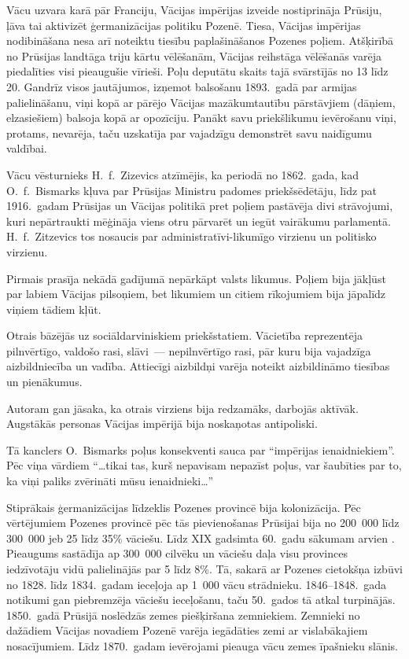 \documentclass[twoside,a5paper,12pt,fleqn,openany]{extbook}
\begin{document}
Vācu uzvara karā pār Franciju, Vācijas impērijas izveide nostiprināja Prūsiju, ļāva tai aktivizēt ģermanizācijas politiku Pozenē. Tiesa, Vācijas impērijas nodibināšana nesa arī noteiktu tiesību paplašināšanos Pozenes poļiem. Atšķirībā no Prūsijas landtāga triju kārtu vēlēšanām, Vācijas reihstāga vēlēšanās varēja piedalīties visi pieaugušie vīrieši. Poļu deputātu skaits tajā svārstījās no 13 līdz 20. Gandrīz visos jautājumos, izņemot balsošanu 1893.~gadā par armijas palielināšanu, viņi kopā ar pārējo Vācijas mazākumtautību pārstāvjiem (dāņiem, elzasiešiem) balsoja kopā ar opozīciju. Panākt savu priekšlikumu ievērošanu viņi, protams, nevarēja, taču uzskatīja par vajadzīgu demonstrēt savu naidīgumu valdībai.

Vācu vēsturnieks H.~f.~Zizevics atzīmējis, ka periodā no 1862.~gada, kad O.~f.~Bismarks kļuva par Prūsijas Ministru padomes priekšsēdētāju, līdz pat 1916.~gadam Prūsijas un Vācijas politikā pret poļiem pastāvēja divi strāvojumi, kuri nepārtraukti mēģināja viens otru pārvarēt un iegūt vairākumu parlamentā. H.~f.~Zitzevics tos nosaucis par administratīvi-likumīgo virzienu un politisko virzienu.

Pirmais prasīja nekādā gadījumā nepārkāpt valsts likumus. Poļiem bija jākļūst par labiem Vācijas pilsoņiem, bet likumiem un citiem rīkojumiem bija jāpalīdz viņiem tādiem kļūt.

Otrais bāzējās uz sociāldarviniskiem priekšstatiem. Vācietība reprezentēja pilnvērtīgo, valdošo rasi, slāvi~--- nepilnvērtīgo rasi, pār kuru bija vajadzīga aizbildniecība un vadība. Attiecīgi aizbildņi varēja noteikt aizbildināmo tiesības un pienākumus.

Autoram gan jāsaka, ka otrais virziens bija redzamāks, darbojās aktīvāk. Augstākās personas Vācijas impērijā bija noskaņotas antipoliski.

Tā kanclers O.~Bismarks poļus konsekventi sauca par ``impērijas ienaidniekiem''. Pēc viņa vārdiem ``\dots{}tikai tas, kurš nepavisam nepazīst poļus, var šaubīties par to, ka viņi paliks zvērināti mūsu ienaidnieki\dots{}''

Stiprākais ģermanizācijas līdzeklis Pozenes provincē bija kolonizācija. Pēc vērtējumiem Pozenes provincē pēc tās pievienošanas Prūsijai bija no 200~000 līdz 300~000 jeb 25 līdz 35\% vāciešu. Līdz XIX gadsimta 60.~gadu sākumam  arvien . Pieaugums sastādīja ap 300~000 cilvēku un vāciešu daļa visu provinces iedzīvotāju vidū palielinājās par 5 līdz 8\%. Tā, sakarā ar Pozenes cietokšņa izbūvi no 1828. līdz 1834.~gadam ieceļoja ap 1~000 vācu strādnieku. 1846--1848.~gada notikumi gan piebremzēja vāciešu ieceļošanu, taču 50.~gados tā atkal turpinājās. 1850.~gadā Prūsijā noslēdzās zemes piešķiršana zemniekiem. Zemnieki no dažādiem Vācijas novadiem Pozenē varēja iegādāties zemi ar vislabākajiem nosacījumiem. Līdz 1870.~gadam ievērojami pieauga vācu zemes īpašnieku slānis.
\end{document}
